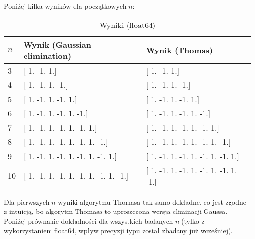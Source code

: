 \documentclass{article}
\begin{document}
Poniżej kilka wyników dla początkowych $n$:

\begin{table}[H]
\hspace*{-1.2cm}
\centering
\begin{tabular}{|l|p{5cm}|p{8cm}|}
\hline
$n$ & Wynik (Gaussian elimination) & Wynik (Thomas) \\ \hline
3 & [ 1. -1.  1.] & [ 1. -1.  1.] \\ \hline
4 & [ 1. -1.  1. -1.] & [ 1. -1.  1. -1.] \\ \hline
5 & [ 1. -1.  1. -1.  1.] & [ 1. -1.  1. -1.  1.] \\ \hline
6 & [ 1. -1.  1. -1.  1. -1.] & [ 1. -1.  1. -1.  1. -1.] \\ \hline
7 & [ 1. -1.  1. -1.  1. -1.  1.] & [ 1. -1.  1. -1.  1. -1.  1.] \\ \hline
8 & [ 1. -1.  1. -1.  1. -1.  1. -1.] & [ 1. -1.  1. -1.  1. -1.  1. -1.] \\ \hline
9 & [ 1. -1.  1. -1.  1. -1.  1. -1.  1.] & [ 1. -1.  1. -1.  1. -1.  1. -1.  1.] \\ \hline
10 & [ 1. -1.  1. -1.  1. -1.  1. -1.  1. -1.] & [ 1. -1.  1. -1.  1. -1.  1. -1.  1. -1.] \\ \hline
\end{tabular}
\caption{Wyniki (float64)}
\hspace*{-1.2cm}
\end{table}

Dla pierwszych $n$ wyniki algorytmu Thomasa tak samo dokładne, co jest zgodne z intuicją, bo algorytm Thomasa to uproszczona
wersja eliminacji Gaussa. Poniżej prównanie dokładności dla wszystkich badanych $n$ (tylko z wykorzystaniem float64, wpływ
precyzji typu został zbadany już wcześniej).

\newpage
\thispagestyle{empty}
\end{document}
